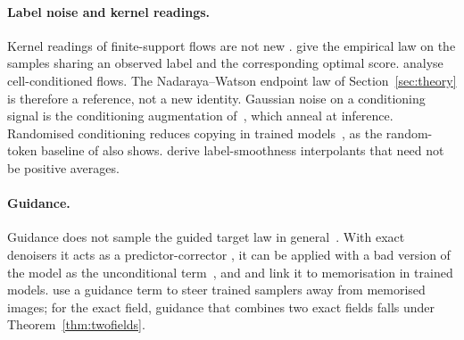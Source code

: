 \documentclass{article} %
\theoremstyle{plain}
\theoremstyle{definition}
\theoremstyle{remark}
\begin{document}
\paragraph{Label noise and kernel readings.} Kernel readings of finite-support flows are not new
\citep{scarvelis2025closedform,chen2026scoresmoothing,smola2026support}.
\citet[Definition~6.2 and Theorem~6.4]{baptista2025memorization} give the empirical law on the
samples sharing an observed label and the corresponding optimal score.
\citet[Section~3.3]{physicscfm2026} analyse cell-conditioned flows. The
Nadaraya--Watson endpoint law of Section~\ref{sec:theory} is therefore a reference, not a new
identity. Gaussian noise on a conditioning signal is the conditioning augmentation
of~\citet{ho2022cascaded}, which \citet{sadat2024cads} anneal at inference. Randomised
conditioning reduces copying in trained models~\citep{somepalli2023copying}, as the random-token
baseline of \citet{wen2024detecting} also shows.
\citet[Theorems~2--3]{pfrommer2025conditional} derive label-smoothness interpolants that need not
be positive averages.

\paragraph{Guidance.} Guidance does not sample the guided target law in
general~\citep{chidambaram2024guidance,wu2024theoretical}. With exact denoisers it acts as a predictor-corrector
\citep{bradley2024cfg}, it can be applied with a bad version of the model as the unconditional
term~\citep{karras2024autoguidance}, and \citet{jain2025attraction} and \citet{kim2025how} link it
to memorisation in trained models. \citet{chen2024memorizationfree} use a guidance term to steer
trained samplers away from memorised images; for the exact field, guidance that combines two
exact fields falls under Theorem~\ref{thm:twofields}.
\end{document}
